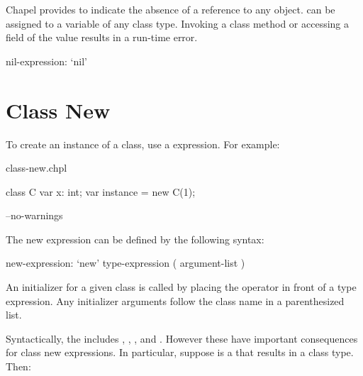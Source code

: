 Chapel provides  to indicate the absence of a reference to
any object.   can be assigned to a variable of any class
type.  Invoking a class method or accessing a field of the 
value results in a run-time error.

\begin{syntax}
nil-expression:
  `nil'
\end{syntax}

\section{Class New}
\label{Class_New}

To create an instance of a class, use a  expression. For
example:

\begin{chapelexample}{class-new.chpl}
\begin{chapel}
class C {
  var x: int;
}
var instance = new C(1);
\end{chapel}
\begin{chapelcompopts}
--no-warnings
\end{chapelcompopts}
\end{chapelexample}

The new expression can be defined by the following syntax:

\begin{syntax}
new-expression:
  `new' type-expression ( argument-list )
\end{syntax}

An initializer for a given class is called by placing the 
operator in front of a type expression. Any initializer arguments follow
the class name in a parenthesized list.

Syntactically, the  includes ,
, , and . However these have
important consequences for class new expressions. In particular, suppose
 is a  that results in a class type. Then:

